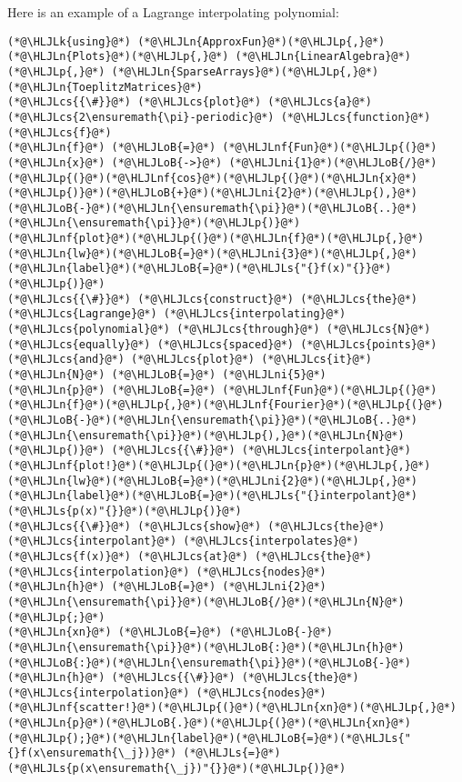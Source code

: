 \documentclass[12pt,a4paper]{article}
\newcommand{\HLJLk}[1]{\textcolor[RGB]{148,91,176}{\textbf{#1}}}
\newcommand{\HLJLn}[1]{#1}
\newcommand{\HLJLnf}[1]{\textcolor[RGB]{66,102,213}{#1}}
\newcommand{\HLJLs}[1]{\textcolor[RGB]{201,61,57}{#1}}
\newcommand{\HLJLni}[1]{\textcolor[RGB]{59,151,46}{#1}}
\newcommand{\HLJLoB}[1]{\textcolor[RGB]{102,102,102}{\textbf{#1}}}
\newcommand{\HLJLp}[1]{#1}
\newcommand{\HLJLcs}[1]{\textcolor[RGB]{153,153,119}{\textit{#1}}}
\begin{document}
Here is an example of a Lagrange interpolating polynomial:


\begin{lstlisting}
(*@\HLJLk{using}@*) (*@\HLJLn{ApproxFun}@*)(*@\HLJLp{,}@*) (*@\HLJLn{Plots}@*)(*@\HLJLp{,}@*) (*@\HLJLn{LinearAlgebra}@*)(*@\HLJLp{,}@*) (*@\HLJLn{SparseArrays}@*)(*@\HLJLp{,}@*) (*@\HLJLn{ToeplitzMatrices}@*)
(*@\HLJLcs{{\#}}@*) (*@\HLJLcs{plot}@*) (*@\HLJLcs{a}@*) (*@\HLJLcs{2\ensuremath{\pi}-periodic}@*) (*@\HLJLcs{function}@*) (*@\HLJLcs{f}@*)
(*@\HLJLn{f}@*) (*@\HLJLoB{=}@*) (*@\HLJLnf{Fun}@*)(*@\HLJLp{(}@*)(*@\HLJLn{x}@*) (*@\HLJLoB{->}@*) (*@\HLJLni{1}@*)(*@\HLJLoB{/}@*)(*@\HLJLp{(}@*)(*@\HLJLnf{cos}@*)(*@\HLJLp{(}@*)(*@\HLJLn{x}@*)(*@\HLJLp{)}@*)(*@\HLJLoB{+}@*)(*@\HLJLni{2}@*)(*@\HLJLp{),}@*)(*@\HLJLoB{-}@*)(*@\HLJLn{\ensuremath{\pi}}@*)(*@\HLJLoB{..}@*)(*@\HLJLn{\ensuremath{\pi}}@*)(*@\HLJLp{)}@*)
(*@\HLJLnf{plot}@*)(*@\HLJLp{(}@*)(*@\HLJLn{f}@*)(*@\HLJLp{,}@*)(*@\HLJLn{lw}@*)(*@\HLJLoB{=}@*)(*@\HLJLni{3}@*)(*@\HLJLp{,}@*)(*@\HLJLn{label}@*)(*@\HLJLoB{=}@*)(*@\HLJLs{"{}f(x)"{}}@*)(*@\HLJLp{)}@*)
(*@\HLJLcs{{\#}}@*) (*@\HLJLcs{construct}@*) (*@\HLJLcs{the}@*) (*@\HLJLcs{Lagrange}@*) (*@\HLJLcs{interpolating}@*) (*@\HLJLcs{polynomial}@*) (*@\HLJLcs{through}@*) (*@\HLJLcs{N}@*) (*@\HLJLcs{equally}@*) (*@\HLJLcs{spaced}@*) (*@\HLJLcs{points}@*) (*@\HLJLcs{and}@*) (*@\HLJLcs{plot}@*) (*@\HLJLcs{it}@*)
(*@\HLJLn{N}@*) (*@\HLJLoB{=}@*) (*@\HLJLni{5}@*)
(*@\HLJLn{p}@*) (*@\HLJLoB{=}@*) (*@\HLJLnf{Fun}@*)(*@\HLJLp{(}@*)(*@\HLJLn{f}@*)(*@\HLJLp{,}@*)(*@\HLJLnf{Fourier}@*)(*@\HLJLp{(}@*)(*@\HLJLoB{-}@*)(*@\HLJLn{\ensuremath{\pi}}@*)(*@\HLJLoB{..}@*)(*@\HLJLn{\ensuremath{\pi}}@*)(*@\HLJLp{),}@*)(*@\HLJLn{N}@*)(*@\HLJLp{)}@*) (*@\HLJLcs{{\#}}@*) (*@\HLJLcs{interpolant}@*)
(*@\HLJLnf{plot!}@*)(*@\HLJLp{(}@*)(*@\HLJLn{p}@*)(*@\HLJLp{,}@*)(*@\HLJLn{lw}@*)(*@\HLJLoB{=}@*)(*@\HLJLni{2}@*)(*@\HLJLp{,}@*)(*@\HLJLn{label}@*)(*@\HLJLoB{=}@*)(*@\HLJLs{"{}interpolant}@*) (*@\HLJLs{p(x)"{}}@*)(*@\HLJLp{)}@*)
(*@\HLJLcs{{\#}}@*) (*@\HLJLcs{show}@*) (*@\HLJLcs{the}@*) (*@\HLJLcs{interpolant}@*) (*@\HLJLcs{interpolates}@*) (*@\HLJLcs{f(x)}@*) (*@\HLJLcs{at}@*) (*@\HLJLcs{the}@*) (*@\HLJLcs{interpolation}@*) (*@\HLJLcs{nodes}@*)
(*@\HLJLn{h}@*) (*@\HLJLoB{=}@*) (*@\HLJLni{2}@*)(*@\HLJLn{\ensuremath{\pi}}@*)(*@\HLJLoB{/}@*)(*@\HLJLn{N}@*)(*@\HLJLp{;}@*)
(*@\HLJLn{xn}@*) (*@\HLJLoB{=}@*) (*@\HLJLoB{-}@*)(*@\HLJLn{\ensuremath{\pi}}@*)(*@\HLJLoB{:}@*)(*@\HLJLn{h}@*)(*@\HLJLoB{:}@*)(*@\HLJLn{\ensuremath{\pi}}@*)(*@\HLJLoB{-}@*)(*@\HLJLn{h}@*) (*@\HLJLcs{{\#}}@*) (*@\HLJLcs{the}@*) (*@\HLJLcs{interpolation}@*) (*@\HLJLcs{nodes}@*)
(*@\HLJLnf{scatter!}@*)(*@\HLJLp{(}@*)(*@\HLJLn{xn}@*)(*@\HLJLp{,}@*)(*@\HLJLn{p}@*)(*@\HLJLoB{.}@*)(*@\HLJLp{(}@*)(*@\HLJLn{xn}@*)(*@\HLJLp{);}@*)(*@\HLJLn{label}@*)(*@\HLJLoB{=}@*)(*@\HLJLs{"{}f(x\ensuremath{\_j})}@*) (*@\HLJLs{=}@*) (*@\HLJLs{p(x\ensuremath{\_j})"{}}@*)(*@\HLJLp{)}@*)
\end{lstlisting}
\end{document}
